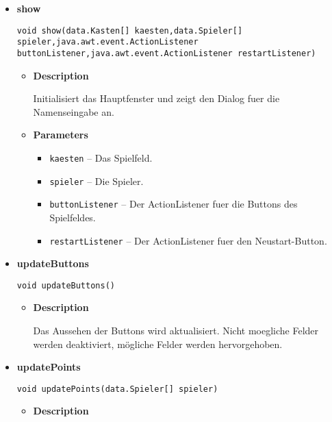 \documentclass[11pt,a4paper]{report}
\begin{document}
{{{{{{{{{{{{{{{{{\begin{itemize}
{\begin{itemize}
{Gibt zurueck ob ein neues Spiel gewuenscht ist.
}
\item{{\bf  Returns} -- 
true wenn ein neues Spiel gewuenscht ist. Sonst false. 
}%
\end{itemize}
}%
\item{ 
{\bf  show}\\
\begin{lstlisting}[frame=none]
void show(data.Kasten[] kaesten,data.Spieler[] spieler,java.awt.event.ActionListener buttonListener,java.awt.event.ActionListener restartListener)\end{lstlisting} %
\begin{itemize}
\item{
{\bf  Description}

Initialisiert das Hauptfenster und zeigt den Dialog fuer die Namenseingabe an.
}
\item{
{\bf  Parameters}
  \begin{itemize}
   \item{
\texttt{kaesten} -- Das Spielfeld.}
   \item{
\texttt{spieler} -- Die Spieler.}
   \item{
\texttt{buttonListener} -- Der ActionListener fuer die Buttons des Spielfeldes.}
   \item{
\texttt{restartListener} -- Der ActionListener fuer den Neustart-Button.}
  \end{itemize}
}%
\end{itemize}
}%
\item{ 
{\bf  updateButtons}\\
\begin{lstlisting}[frame=none]
void updateButtons()\end{lstlisting} %
\begin{itemize}
\item{
{\bf  Description}

Das Aussehen der Buttons wird aktualisiert. Nicht moegliche Felder werden deaktiviert, mögliche Felder werden hervorgehoben.
}
\end{itemize}
}%
\item{ 
{\bf  updatePoints}\\
\begin{lstlisting}[frame=none]
void updatePoints(data.Spieler[] spieler)\end{lstlisting} %
\begin{itemize}
\item{
{\bf  Description}

}
\end{itemize}}
\end{itemize}}}}}}}}}}}}}}}}}}
\end{document}
